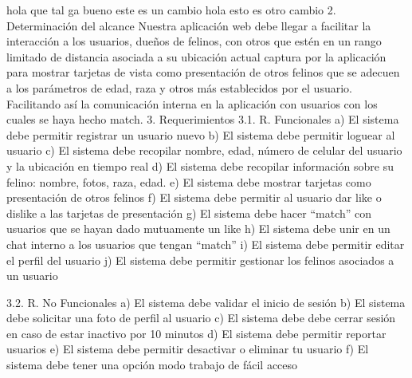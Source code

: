 hola que tal ga
bueno este es un cambio
hola esto es otro cambio
2. Determinación del alcance
Nuestra aplicación web debe llegar a facilitar la interacción a los usuarios, dueños de felinos, con otros que estén en un rango limitado de distancia asociada a su ubicación actual captura por la aplicación para mostrar tarjetas de vista como presentación de otros felinos que se adecuen a los parámetros de edad, raza y otros más establecidos por el usuario. Facilitando así la comunicación interna en la aplicación con usuarios con los cuales se haya hecho match.
3. Requerimientos
3.1. R. Funcionales
a) El sistema debe permitir registrar un usuario nuevo
b) El sistema debe permitir loguear al usuario
c) El sistema debe recopilar nombre, edad, número de celular del usuario y la ubicación en tiempo real
d) El sistema debe recopilar información sobre su felino: nombre, fotos, raza, edad.
e) El sistema debe mostrar tarjetas como presentación de otros felinos
f) El sistema debe permitir al usuario dar like o dislike a las tarjetas de presentación
g) El sistema debe hacer “match” con usuarios que se hayan dado mutuamente un like
h) El sistema debe unir en un chat interno a los usuarios que tengan “match”
i) El sistema debe permitir editar el perfil del usuario
j) El sistema debe permitir gestionar los felinos asociados a un usuario

3.2. R. No Funcionales
a) El sistema debe validar el inicio de sesión
b) El sistema debe solicitar una foto de perfil al usuario
c) El sistema debe debe cerrar sesión en caso de estar inactivo por 10 minutos
d) El sistema debe permitir reportar usuarios
e) El sistema debe permitir desactivar o eliminar tu usuario
f) El sistema debe tener una opción modo trabajo de fácil acceso
